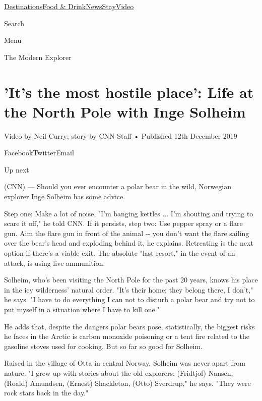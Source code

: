 \href{/}{}\href{/travel}{}

\href{/travel/destinations}{Destinations}\href{/travel/food-and-drink}{Food
\&
Drink}\href{/travel/news}{News}\href{/travel/stay}{Stay}\href{/travel/videos}{Video}

Search

Menu

\href{/specials/world/the-modern-explorers}{}

The Modern Explorer

\hypertarget{its-the-most-hostile-place-life-at-the-north-pole-with-inge-solheim}{%
\section{'It's the most hostile place': Life at the North Pole with Inge
Solheim}\label{its-the-most-hostile-place-life-at-the-north-pole-with-inge-solheim}}

Video by Neil Curry; story by CNN Staff • Published 12th December 2019

FacebookTwitterEmail

Up next

(CNN) --- Should you ever encounter a polar bear in the wild, Norwegian
explorer Inge Solheim has some advice.

Step one: Make a lot of noise. "I'm banging kettles ... I'm shouting and
trying to scare it off," he told CNN. If it persists, step two: Use
pepper spray or a flare gun. Aim the flare gun in front of the animal
-\/- you don't want the flare sailing over the bear's head and exploding
behind it, he explains. Retreating is the next option if there's a
viable exit. The absolute "last resort," in the event of an attack, is
using live ammunition.

Solheim, who's been visiting the North Pole for the past 20 years, knows
his place in the icy wilderness' natural order. "It's their home; they
belong there, I don't," he says. "I have to do everything I can not to
disturb a polar bear and try not to put myself in a situation where I
have to kill one."

He adds that, despite the dangers polar bears pose, statistically, the
biggest risks he faces in the Arctic is carbon monoxide poisoning or a
tent fire related to the gasoline stoves used for cooking. But so far so
good for Solheim.

Raised in the village of Otta in central Norway, Solheim was never apart
from nature. "I grew up with stories about the old explorers: (Fridtjof)
Nansen, (Roald) Amundsen, (Ernest) Shackleton, (Otto) Sverdrup," he
says. "They were rock stars back in the day."

